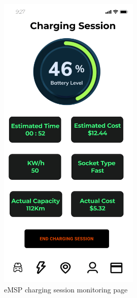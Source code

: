 \documentclass{Configuration_Files/PoliMi3i_thesis}
\begin{document}
\begin{figure}[H]
    \centering
    \includegraphics[width=0.6\textwidth]{Images/user-interface/emsp/eMSP (1)-10.png}
    \caption{eMSP charging session monitoring page}
\end{figure}
\end{document}
